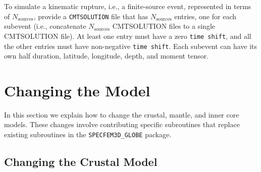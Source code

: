 \documentclass[onecolumn]{article}
\begin{document}
To simulate a kinematic rupture, i.e., a finite-source event,
represented in terms of $N_\mathrm{sources}$,
provide a \texttt{CMTSOLUTION} file that has $N_\mathrm{sources}$ entries,
one for each subevent (i.e., concatenate $N_\mathrm{sources}$ CMTSOLUTION files
to a single CMTSOLUTION file).
At least one entry must have a zero \texttt{time shift},
and all the other entries must have non-negative \texttt{time shift}. Each subevent
can have its own half duration, latitude, longitude, depth, and moment tensor.

\section{Changing the Model}
\label{section:changingmodels}

In this section we explain how to change the crustal, mantle, and
inner core models. These changes involve contributing specific
subroutines that replace existing subroutines in the
\texttt{SPECFEM3D\_GLOBE} package.

\subsection{Changing the Crustal Model}
\end{document}
